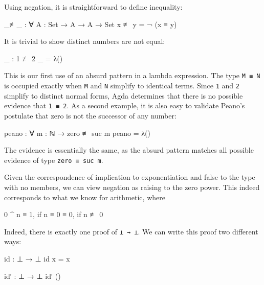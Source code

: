 Using negation, it is straightforward to define inequality:

\begin{fence}
\begin{code}
_≢_ : ∀ {A : Set} → A → A → Set
x ≢ y  =  ¬ (x ≡ y)
\end{code}
\end{fence}

It is trivial to show distinct numbers are not equal:

\begin{fence}
\begin{code}
_ : 1 ≢ 2
_ = λ()
\end{code}
\end{fence}

This is our first use of an absurd pattern in a lambda expression. The
type \texttt{M\ ≡\ N} is occupied exactly when \texttt{M} and \texttt{N}
simplify to identical terms. Since \texttt{1} and \texttt{2} simplify to
distinct normal forms, Agda determines that there is no possible
evidence that \texttt{1\ ≡\ 2}. As a second example, it is also easy to
validate Peano's postulate that zero is not the successor of any number:

\begin{fence}
\begin{code}
peano : ∀ {m : ℕ} → zero ≢ suc m
peano = λ()
\end{code}
\end{fence}

The evidence is essentially the same, as the absurd pattern matches all
possible evidence of type \texttt{zero\ ≡\ suc\ m}.

Given the correspondence of implication to exponentiation and false to
the type with no members, we can view negation as raising to the zero
power. This indeed corresponds to what we know for arithmetic, where

\begin{myDisplay}
0 ^ n  ≡  1,  if n ≡ 0
       ≡  0,  if n ≢ 0
\end{myDisplay}

Indeed, there is exactly one proof of \texttt{⊥\ →\ ⊥}. We can write
this proof two different ways:

\begin{fence}
\begin{code}
id : ⊥ → ⊥
id x = x

id′ : ⊥ → ⊥
id′ ()
\end{code}
\end{fence}

